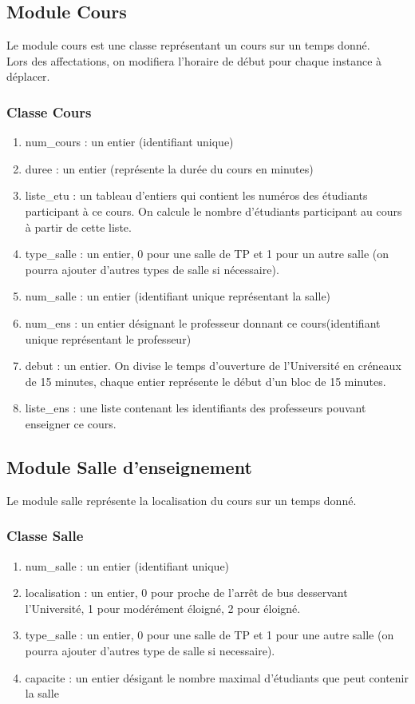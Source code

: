 \documentclass[a4paper,11pt]{article}
\begin{document}
	\subsection{Module Cours}
		Le module cours est une classe représentant un cours sur un temps donné.\\
		Lors des affectations, on modifiera l'horaire de début pour chaque instance à déplacer.\\
		\subsubsection{Classe Cours}
		\begin{enumerate}
			\item num\_cours :  un entier (identifiant unique)
			\item duree : un entier (représente la durée du cours en minutes)
			\item liste\_etu : un tableau d'entiers qui contient les numéros des étudiants participant à ce cours. On calcule le nombre d'étudiants participant au cours à partir de cette liste.
			\item type\_salle : un entier, 0 pour une salle de TP et 1 pour un autre salle (on pourra ajouter d'autres types de salle si nécessaire).
			\item num\_salle : un entier (identifiant unique représentant la salle)
			\item num\_ens : un entier désignant le professeur donnant ce cours(identifiant unique représentant le professeur)
			\item debut : un entier. On divise le temps d'ouverture de l'Université en créneaux de 15 minutes, chaque entier représente le début d'un bloc de 15 minutes. 
			\item liste\_ens : une liste contenant les identifiants des professeurs pouvant enseigner ce cours.
		\end{enumerate}

	\subsection{Module Salle d'enseignement}
		Le module salle représente la localisation du cours sur un temps donné.
		\subsubsection{Classe Salle}
		\begin{enumerate}
			\item num\_salle : un entier (identifiant unique)
			\item localisation : un entier, 0 pour proche de l'arrêt de bus desservant l'Université, 1 pour modérément éloigné, 2 pour éloigné. 
			\item type\_salle : un entier, 0 pour une salle de TP et 1 pour une autre salle (on pourra ajouter d'autres type de salle si necessaire).
			\item capacite : un entier désigant le nombre maximal d'étudiants que peut contenir la salle	
		\end{enumerate}
\end{document}
